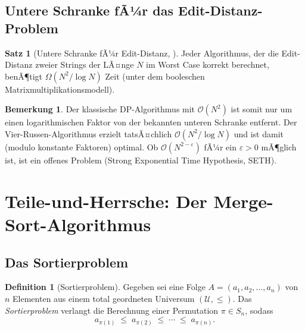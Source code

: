 ﻿\documentclass[a4paper,12pt]{article}
\theoremstyle{definition}
\newtheorem{definition}{Definition}
\newtheorem{satz}{Satz}
\newtheorem{bemerkung}{Bemerkung}
\begin{document}
\subsection{Untere Schranke fÃ¼r das Edit-Distanz-Problem}

\begin{satz}[Untere Schranke fÃ¼r Edit-Distanz, \cite{masek1980}]
    Jeder Algorithmus, der die Edit-Distanz zweier Strings der LÃ¤nge $N$ im
    Worst Case korrekt berechnet, benÃ¶tigt $\Omega(N^2 / \log N)$ Zeit
    (unter dem booleschen Matrixmultiplikationsmodell).
\end{satz}

\begin{bemerkung}
    Der klassische DP-Algorithmus mit $\mathcal{O}(N^2)$ ist somit nur um einen
    logarithmischen Faktor von der bekannten unteren Schranke entfernt. Der
    Vier-Russen-Algorithmus \cite{masek1980} erzielt tatsÃ¤chlich
    $\mathcal{O}(N^2 / \log N)$ und ist damit (modulo konstante Faktoren) optimal.
    Ob $\mathcal{O}(N^{2-\varepsilon})$ fÃ¼r ein $\varepsilon > 0$ mÃ¶glich ist,
    ist ein offenes Problem (Strong Exponential Time Hypothesis, SETH).
\end{bemerkung}

\section{Teile-und-Herrsche: Der Merge-Sort-Algorithmus}

\subsection{Das Sortierproblem}

\begin{definition}[Sortierproblem]
    Gegeben sei eine Folge $A = (a_1, a_2, \ldots, a_n)$ von $n$ Elementen aus
    einem total geordneten Universum $(\mathcal{U}, \leq)$. Das
    \emph{Sortierproblem} verlangt die Berechnung einer Permutation
    $\pi \in S_n$, sodass
    \[
        a_{\pi(1)} \;\leq\; a_{\pi(2)} \;\leq\; \cdots \;\leq\; a_{\pi(n)}.
    \]
\end{definition}
\end{document}
